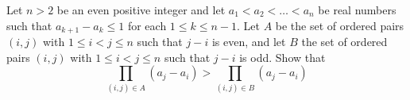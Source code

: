 Let $n > 2$ be an even positive integer and let $a_1 < a_2 < \dots < a_n$ be real numbers such that $a_{k + 1} - a_k \leq 1$ for each $1 \leq k \leq n - 1$. Let $A$ be the set of ordered pairs $(i, j)$ with $1 \leq i < j \leq n$ such that $j - i$ is even, and let $B$ the set of ordered pairs $(i, j)$ with $1 \leq i < j \leq n$ such that $j - i$ is odd. Show that$$\prod_{(i, j) \in A} (a_j - a_i) > \prod_{(i, j) \in B} (a_j - a_i)$$